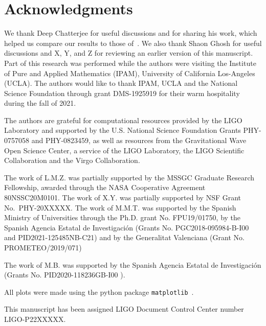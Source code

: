 \section*{Acknowledgments}
We thank Deep Chatterjee for useful discussions and for sharing his work, which
helped us compare our results to those of~\cite{Chatterjee:2019avs}. We also
thank Shaon Ghosh for useful discussions and X, Y, and Z for reviewing an
earlier version of this manuscript. Part of this research was performed while
the authors were visiting the Institute of Pure and Applied Mathematics (IPAM), 
University of California Los-Angeles (UCLA). The authors would like to thank 
IPAM, UCLA and the National Science Foundation through grant DMS-1925919 for
their warm hospitality during the fall of 2021. 
%

The authors are grateful for computational resources provided by the LIGO 
Laboratory and supported by the U.S. National Science Foundation Grants 
PHY-0757058 and PHY-0823459, as well as resources from the Gravitational Wave
Open Science Center, a service of the LIGO Laboratory, the LIGO Scientific 
Collaboration and the Virgo Collaboration.
%

The work of L.M.Z. was partially supported by the MSSGC Graduate
Research Fellowship, awarded through the NASA Cooperative Agreement
80NSSC20M0101. 
%
The work of X.Y. was partially supported by NSF Grant No.~PHY-20XXXXX.
%
The work of M.M.T. was supported by the Spanish Ministry of Universities through the Ph.D. grant No. FPU19/01750, by the Spanish Agencia Estatal de Investigaci\'on (Grants No. PGC2018-095984-B-I00 and PID2021-125485NB-C21) and by the Generalitat Valenciana (Grant No. PROMETEO/2019/071)

The work of M.B. was supported by the Spanish Agencia Estatal de Investigaci\'on (Grants No. PID2020-118236GB-I00 ).

All plots were made using the python package \texttt{matplotlib}~\cite{Hunter:2007ouj}.

This manuscript has been assigned LIGO Document Control Center number LIGO-P22XXXXX.
